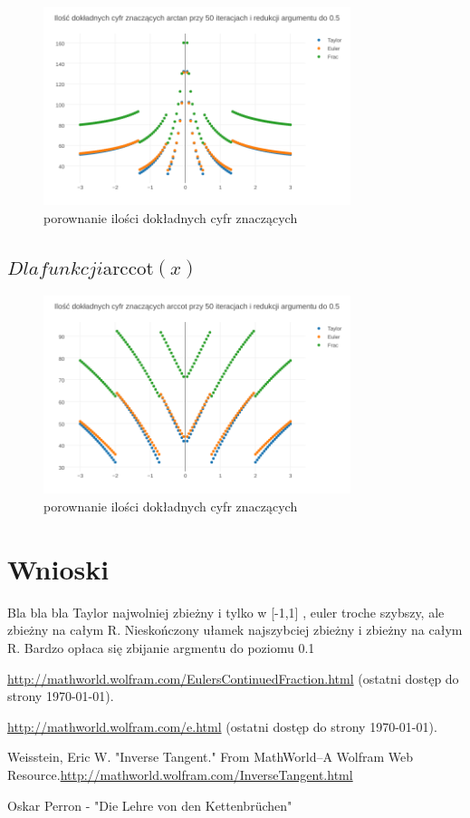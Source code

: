 \documentclass{article}
\begin{document}
	\begin{figure}[h]
		\includegraphics[width=0.8\textwidth,scale=0.5]{atan_znaczace.png}
		\caption{porownanie ilości dokładnych cyfr znaczących}
		\label{wskaźnik uwarunkowania}
	\end{figure}
\FloatBarrier
\subsection{$Dla funkcji \textrm{arccot}(x)$}
	\FloatBarrier
	\begin{figure}[h]
		\includegraphics[width=0.8\textwidth,scale=0.5]{acot_znaczace.png}
		\caption{porownanie ilości dokładnych cyfr znaczących}
		\label{wskaźnik uwarunkowania}
	\end{figure}

	
\section{Wnioski}
Bla bla bla Taylor najwolniej zbieżny i tylko w [-1,1]
, euler troche szybszy, ale zbieżny na całym R.
Nieskończony ułamek najszybciej zbieżny i zbieżny na całym R.
Bardzo opłaca się zbijanie argmentu do poziomu 0.1


\begin{thebibliography}{9}
	\itemsep2pt
	 \url{http://mathworld.wolfram.com/EulersContinuedFraction.html}
	(ostatni dostęp do strony \today).
	
	 \url{http://mathworld.wolfram.com/e.html}
	(ostatni dostęp do strony \today).
	
	Weisstein, Eric W. "Inverse Tangent." From MathWorld--A Wolfram Web Resource.\url{http://mathworld.wolfram.com/InverseTangent.html}  
	
	 Oskar Perron - "Die Lehre von den Kettenbrüchen"
	
\end{thebibliography}
\end{document}
